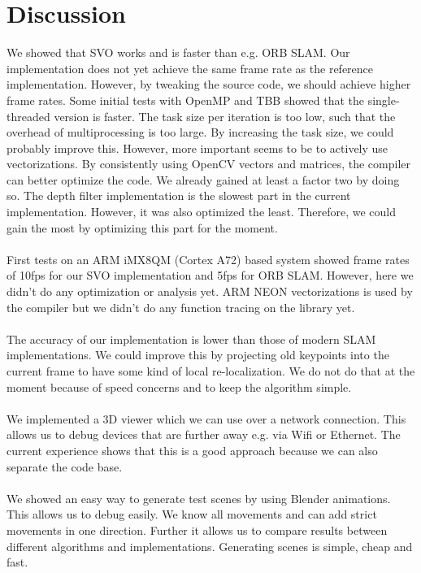 \documentclass[11pt,a4paper,titlepage,oneside]{report}
\begin{document}
\chapter{Discussion}\label{ch:discussion}

We showed that SVO works and is faster than e.g. ORB SLAM. Our implementation does not yet achieve the same frame rate as the reference implementation. However, by tweaking the source code, we should achieve higher frame rates. Some initial tests with OpenMP and TBB showed that the single-threaded version is faster. The task size per iteration is too low, such that the overhead of multiprocessing is too large. By increasing the task size, we could probably improve this. However, more important seems to be to actively use vectorizations. By consistently using OpenCV vectors and matrices, the compiler can better optimize the code. We already gained at least a factor two by doing so. The depth filter implementation is the slowest part in the current implementation. However, it was also optimized the least. Therefore, we could gain the most by optimizing this part for the moment.\\\\
First tests on an ARM iMX8QM (Cortex A72) based system showed frame rates of 10fps for our SVO implementation and 5fps for ORB SLAM. However, here we didn't do any optimization or analysis yet. ARM NEON vectorizations is used by the compiler but we didn't do any function tracing on the library yet.\\\\
The accuracy of our implementation is lower than those of modern SLAM implementations. We could improve this by projecting old keypoints into the current frame to have some kind of local re-localization. We do not do that at the moment because of speed concerns and to keep the algorithm simple.\\\\
We implemented a 3D viewer which we can use over a network connection. This allows us to debug devices that are further away e.g. via Wifi or Ethernet. The current experience shows that this is a good approach because we can also separate the code base.\\\\
We showed an easy way to generate test scenes by using Blender animations. This allows us to debug easily. We know all movements and can add strict movements in one direction. Further it allows us to compare results between different algorithms and implementations. Generating scenes is simple, cheap and fast.\\\\
\end{document}
